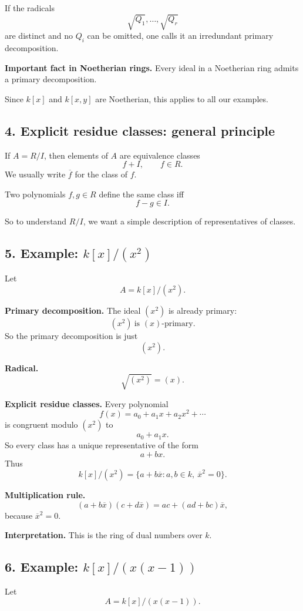 \documentclass[12pt,a4paper]{article}
\theoremstyle{notespace}
\begin{document}
If the radicals
\[
\sqrt{Q_1},\dots,\sqrt{Q_r}
\]
are distinct and no \(Q_i\) can be omitted, one calls it an irredundant primary decomposition.

\textbf{Important fact in Noetherian rings.}
Every ideal in a Noetherian ring admits a primary decomposition.

Since \(k[x]\) and \(k[x,y]\) are Noetherian, this applies to all our examples.

\subsection{4. Explicit residue classes: general principle}

If \(A=R/I\), then elements of \(A\) are equivalence classes
\[
f+I,\qquad f\in R.
\]
We usually write \(\overline f\) for the class of \(f\).

Two polynomials \(f,g\in R\) define the same class iff
\[
f-g\in I.
\]

So to understand \(R/I\), we want a simple description of representatives of classes.

\subsection{5. Example: \(k[x]/(x^2)\)}

Let
\[
A=k[x]/(x^2).
\]

\textbf{Primary decomposition.}
The ideal \((x^2)\) is already primary:
\[
(x^2)\ \text{is }(x)\text{-primary}.
\]
So the primary decomposition is just
\[
(x^2).
\]

\textbf{Radical.}
\[
\sqrt{(x^2)}=(x).
\]

\textbf{Explicit residue classes.}
Every polynomial
\[
f(x)=a_0+a_1x+a_2x^2+\cdots
\]
is congruent modulo \((x^2)\) to
\[
a_0+a_1x.
\]
So every class has a unique representative of the form
\[
a+b x.
\]
Thus
\[
k[x]/(x^2)=\{a+b\overline x:a,b\in k,\ \overline x^2=0\}.
\]

\textbf{Multiplication rule.}
\[
(a+b\overline x)(c+d\overline x)=ac+(ad+bc)\overline x,
\]
because \(\overline x^2=0\).

\textbf{Interpretation.}
This is the ring of dual numbers over \(k\).

\subsection{6. Example: \(k[x]/(x(x-1))\)}

Let
\[
A=k[x]/(x(x-1)).
\]
\end{document}
